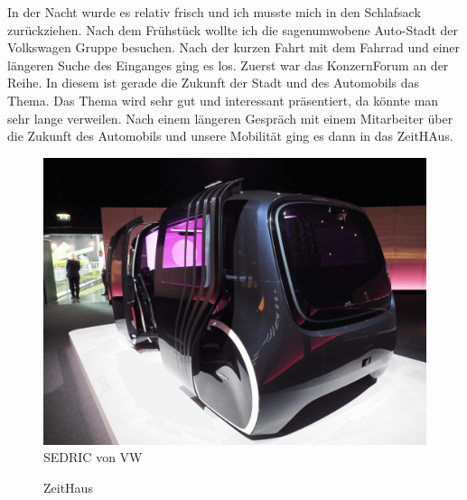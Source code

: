 In der Nacht wurde es relativ frisch und ich musste mich in den Schlafsack zurückziehen.
Nach dem Frühstück wollte ich die sagenumwobene Auto-Stadt der Volkswagen Gruppe besuchen.
Nach der kurzen Fahrt mit dem Fahrrad und einer längeren Suche des Einganges ging es los.
Zuerst war das KonzernForum an der Reihe. 
In diesem ist gerade die Zukunft der Stadt und des Automobils das Thema.
Das Thema wird sehr gut und interessant präsentiert, da könnte man sehr lange verweilen.
Nach einem längeren Gespräch mit einem Mitarbeiter über die Zukunft des Automobils und unsere Mobilität ging es dann in das ZeitHAus.
\newpage

\begin{figure}[h]
    \centering
    \includegraphics[width=\textwidth]{../Bilder/Sylt/52.png}
    \caption{SEDRIC von VW}
    \label{img:SEDRIC von VW}
\end{figure}

\begin{figure}[H]
   \centering
   \quad
   \quad
   \quad
   \caption[ZeitHaus]{ZeitHaus}
\end{figure}

